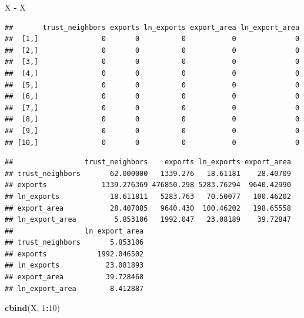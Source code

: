 \documentclass[]{book}
\newenvironment{Shaded}{\begin{snugshade}}{\end{snugshade}}
\newcommand{\DecValTok}[1]{\textcolor[rgb]{0.00,0.00,0.81}{#1}}
\newcommand{\KeywordTok}[1]{\textcolor[rgb]{0.13,0.29,0.53}{\textbf{#1}}}
\newcommand{\NormalTok}[1]{#1}
\newcommand{\OperatorTok}[1]{\textcolor[rgb]{0.81,0.36,0.00}{\textbf{#1}}}
\newcommand{\StringTok}[1]{\textcolor[rgb]{0.31,0.60,0.02}{#1}}
\theoremstyle{definition}
\theoremstyle{definition}
\theoremstyle{definition}
\theoremstyle{remark}
\begin{document}
\begin{Shaded}
\begin{Highlighting}[]
\NormalTok{X }\OperatorTok{-}\StringTok{ }\NormalTok{X}
\end{Highlighting}
\end{Shaded}

\begin{verbatim}
##       trust_neighbors exports ln_exports export_area ln_export_area
##  [1,]               0       0          0           0              0
##  [2,]               0       0          0           0              0
##  [3,]               0       0          0           0              0
##  [4,]               0       0          0           0              0
##  [5,]               0       0          0           0              0
##  [6,]               0       0          0           0              0
##  [7,]               0       0          0           0              0
##  [8,]               0       0          0           0              0
##  [9,]               0       0          0           0              0
## [10,]               0       0          0           0              0
\end{verbatim}

\begin{Shaded}
\end{Shaded}

\begin{verbatim}
##                 trust_neighbors    exports ln_exports export_area
## trust_neighbors       62.000000   1339.276   18.61181    28.40709
## exports             1339.276369 476850.298 5283.76294  9640.42990
## ln_exports            18.611811   5283.763   70.50077   100.46202
## export_area           28.407085   9640.430  100.46202   198.65558
## ln_export_area         5.853106   1992.047   23.08189    39.72847
##                 ln_export_area
## trust_neighbors       5.853106
## exports            1992.046502
## ln_exports           23.081893
## export_area          39.728468
## ln_export_area        8.412887
\end{verbatim}

\begin{Shaded}
\begin{Highlighting}[]
\KeywordTok{cbind}\NormalTok{(X, }\DecValTok{1}\OperatorTok{:}\DecValTok{10}\NormalTok{)}
\end{Highlighting}
\end{Shaded}
\end{document}
